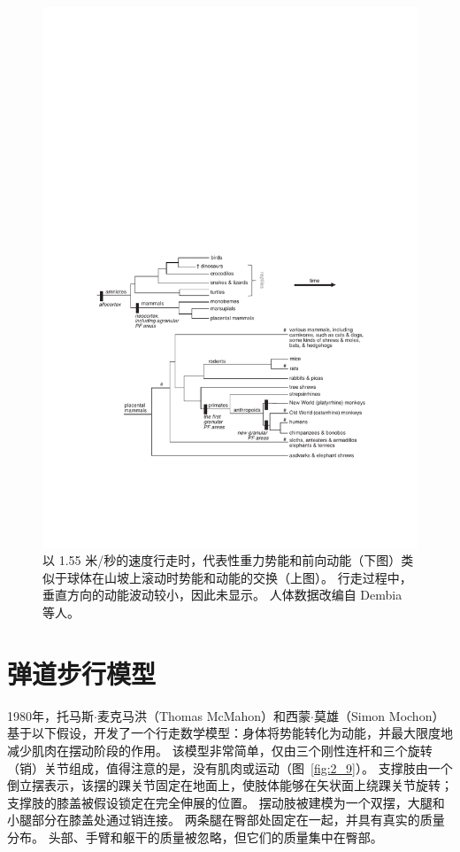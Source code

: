 \begin{figure}[!htb]
	\centering
	\includegraphics[width=0.8\linewidth]{chap2/2_8}
	\caption{以 1.55 米/秒的速度行走时，代表性重力势能和前向动能（下图）类似于球体在山坡上滚动时势能和动能的交换（上图）。
		行走过程中，垂直方向的动能波动较小，因此未显示。
		人体数据改编自 Dembia 等人\cite{dembia2017simulating}。 \label{fig:2_8}}
\end{figure}


\section{弹道步行模型}

1980年，托马斯$\cdot$麦克马洪（Thomas McMahon）和西蒙$\cdot$莫雄（Simon Mochon）基于以下假设，开发了一个行走数学模型：身体将势能转化为动能，并最大限度地减少肌肉在摆动阶段的作用。
该模型非常简单，仅由三个刚性连杆和三个旋转（销）关节组成，值得注意的是，没有肌肉或运动（图~\ref{fig:2_9}）。
支撑肢由一个倒立摆表示，该摆的踝关节固定在地面上，使肢体能够在矢状面上绕踝关节旋转；
支撑肢的膝盖被假设锁定在完全伸展的位置。
摆动肢被建模为一个双摆，大腿和小腿部分在膝盖处通过销连接。
两条腿在臀部处固定在一起，并具有真实的质量分布。
头部、手臂和躯干的质量被忽略，但它们的质量集中在臀部。



